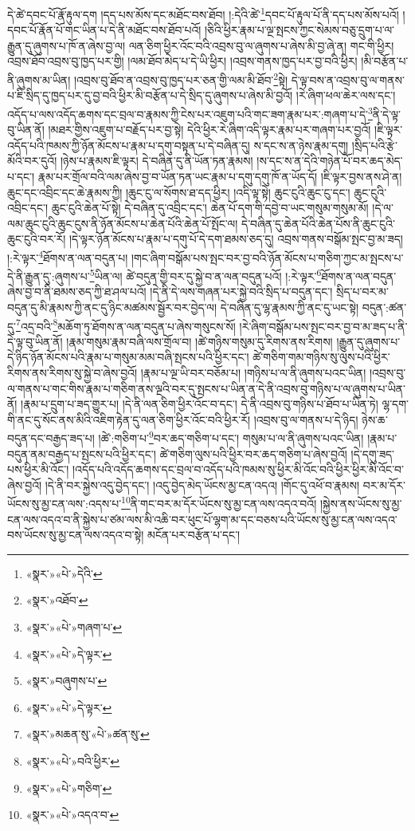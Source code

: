 དེ་ཚེ་དབང་པོ་རྣོ་རྟུལ་དག །དད་པས་མོས་དང་མཐོང་བས་ཐོབ། །:དེའི་ཚེ་\footnote{«སྣར་»«པེ་»དེའི་}དབང་པོ་རྟུལ་པོ་ནི་དད་པས་མོས་པའོ། །དབང་པོ་རྣོན་པོ་གང་ཡིན་པ་དེ་ནི་མཐོང་བས་ཐོབ་པའོ། །ཅིའི་ཕྱིར་རྣམ་པ་ལྔ་སྤངས་ཀྱང་སེམས་བཅུ་དྲུག་པ་ལ་རྒྱུན་དུ་ཞུགས་པ་ཁོ་ན་ཞེས་བྱ་ལ། ལན་ཅིག་ཕྱིར་འོང་བའི་འབྲས་བུ་ལ་ཞུགས་པ་ཞེས་མི་བྱ་ཞེ་ན། གང་གི་ཕྱིར། འབྲས་ཐོབ་འབྲས་བུ་ཁྱད་པར་གྱི། །ལམ་ཐོབ་མེད་པ་དེ་ཡི་ཕྱིར། །འབྲས་གནས་ཁྱད་པར་བྱ་བའི་ཕྱིར། །མི་བརྩོན་པ་ནི་ཞུགས་མ་ཡིན། །འབྲས་བུ་ཐོབ་ན་འབྲས་བུ་ཁྱད་པར་ཅན་གྱི་ལམ་མི་ཐོབ་\footnote{«སྣར་»འཐོབ་}སྟེ། དེ་ལྟ་བས་ན་འབྲས་བུ་ལ་གནས་པ་ཇི་སྲིད་དུ་ཁྱད་པར་དུ་བྱ་བའི་ཕྱིར་མི་བརྩོན་པ་དེ་སྲིད་དུ་ཞུགས་པ་ཞེས་མི་བྱའོ། །རེ་ཞིག་ཕལ་ཆེར་ལས་དང་། འདོད་པ་ལས་འདོད་ཆགས་དང་བྲལ་བ་རྣམས་ཀྱི་ངེས་པར་འཇུག་པའི་གང་ཟག་རྣམ་པར་:གཞག་པ་དེ་\footnote{«སྣར་»«པེ་»གཞག་པ་}ནི་དེ་ལྟ་བུ་ཡིན་ནོ། །མཐར་གྱིས་འཇུག་པ་བརྗོད་པར་བྱ་སྟེ། དེའི་ཕྱིར་རེ་ཞིག་འདི་ལྟར་རྣམ་པར་གཞག་པར་བྱའོ། །ཇི་ལྟར་འདོད་པའི་ཁམས་ཀྱི་ཉོན་མོངས་པ་རྣམ་པ་དགུ་བསྟན་པ་དེ་བཞིན་དུ། ས་དང་ས་ན་ཉེས་རྣམ་དགུ། །སྲིད་པའི་རྩེ་མོའི་བར་དུའོ། །ཉེས་པ་རྣམས་ཇི་ལྟར། དེ་བཞིན་དུ་ནི་ཡོན་ཏན་རྣམས། །ས་དང་ས་ན་དེའི་གཉེན་པོ་བར་ཆད་མེད་པ་དང་། རྣམ་པར་གྲོལ་བའི་ལམ་ཞེས་བྱ་བ་ཡོན་ཏན་ཡང་རྣམ་པ་དགུ་དགུ་ཁོ་ན་ཡོད་དོ། །ཇི་ལྟར་བྱས་ནས་ཤེ་ན། ཆུང་དང་འབྲིང་དང་ཆེ་རྣམས་ཀྱི། །ཆུང་ངུ་ལ་སོགས་ཐ་དད་ཕྱིར། །འདི་ལྟ་སྟེ། ཆུང་ངུའི་ཆུང་ངུ་དང་། ཆུང་ངུའི་འབྲིང་དང་། ཆུང་ངུའི་ཆེན་པོ་སྟེ། དེ་བཞིན་དུ་འབྲིང་དང་། ཆེན་པོ་དག་གི་དབྱེ་བ་ཡང་གསུམ་གསུམ་མོ། །དེ་ལ་ལམ་ཆུང་ངུའི་ཆུང་ངུས་ནི་ཉོན་མོངས་པ་ཆེན་པོའི་ཆེན་པོ་སྤོང་ལ། དེ་བཞིན་དུ་ཆེན་པོའི་ཆེན་པོས་ནི་ཆུང་ངུའི་ཆུང་ངུའི་བར་རོ། །དེ་ལྟར་ཉོན་མོངས་པ་རྣམ་པ་དགུ་པོ་དེ་དག་ཐམས་ཅད་དུ། འབྲས་གནས་བསྒོམ་སྤང་བྱ་མ་ཟད། །:རེ་ལྟར་\footnote{«སྣར་»«པེ་»དེ་ལྟར་}ཐོགས་ན་ལན་བདུན་པ། །གང་ཞིག་བསྒོམ་པས་སྤང་བར་བྱ་བའི་ཉོན་མོངས་པ་གཅིག་ཀྱང་མ་སྤངས་པ་དེ་ནི་རྒྱུན་དུ་:ཞུགས་པ་\footnote{«སྣར་»བཞུགས་པ་}ཡིན་ལ། ཚེ་བདུན་གྱི་བར་དུ་སྐྱེ་བ་ན་ལན་བདུན་པའོ། །:རེ་ལྟར་\footnote{«སྣར་»«པེ་»དེ་ལྟར་}ཐོགས་ན་ལན་བདུན་ཞེས་བྱ་བ་ནི་ཐམས་ཅད་ཀྱི་ཐ་ཤལ་པའོ། །དེ་ནི་དེ་ལས་གཞན་པར་སྐྱེ་བའི་སྲིད་པ་བདུན་དང་། སྲིད་པ་བར་མ་བདུན་དུ་མི་རྣམས་ཀྱི་ནང་དུ་ཉིང་མཚམས་སྦྱོར་བར་བྱེད་ལ། དེ་བཞིན་དུ་ལྷ་རྣམས་ཀྱི་ནང་དུ་ཡང་སྟེ། བདུན་:ཚན་དུ་\footnote{«སྣར་»མཆན་སུ་«པེ་»ཚན་སུ་}འདྲ་བའི་\footnote{«སྣར་»«པེ་»བའི་ཕྱིར་}མཆོག་ཏུ་ཐོགས་ན་ལན་བདུན་པ་ཞེས་གསུངས་སོ། །རེ་ཞིག་བསྒོམ་པས་སྤང་བར་བྱ་བ་མ་ཟད་པ་ནི་དེ་ལྟ་བུ་ཡིན་ནོ། །རྣམ་གསུམ་རྣམ་བཞི་ལས་གྲོལ་བ། །ཚེ་གཉིས་གསུམ་དུ་རིགས་ནས་རིགས། །རྒྱུན་དུ་ཞུགས་པ་དེ་ཉིད་ཉོན་མོངས་པའི་རྣམ་པ་གསུམ་མམ་བཞི་སྤངས་པའི་ཕྱིར་དང་། ཚེ་གཅིག་གམ་གཉིས་སུ་ལུས་པའི་ཕྱིར་རིགས་ནས་རིགས་སུ་སྐྱེ་བ་ཞེས་བྱའོ། །རྣམ་པ་ལྔ་ཡི་བར་བཅོམ་པ། །གཉིས་པ་ལ་ནི་ཞུགས་པའང་ཡིན། །འབྲས་བུ་ལ་གནས་པ་གང་གིས་རྣམ་པ་གཅིག་ནས་ལྔའི་བར་དུ་སྤངས་པ་ཡིན་ན་དེ་ནི་འབྲས་བུ་གཉིས་པ་ལ་ཞུགས་པ་ཡིན་ནོ། །རྣམ་པ་དྲུག་པ་ཟད་གྱུར་པ། །དེ་ནི་ལན་ཅིག་ཕྱིར་འོང་བ་དང་། དེ་ནི་འབྲས་བུ་གཉིས་པ་ཐོབ་པ་ཡིན་ཏེ། ལྷ་དག་གི་ནང་དུ་སོང་ནས་མིའི་འཇིག་རྟེན་དུ་ལན་ཅིག་ཕྱིར་འོང་བའི་ཕྱིར་རོ། །འབྲས་བུ་ལ་གནས་པ་དེ་ཉིད། ཉེས་ཆ་བདུན་དང་བརྒྱད་ཟད་པ། །ཚེ་:གཅིག་པ་\footnote{«སྣར་»«པེ་»གཅིག་}བར་ཆད་གཅིག་པ་དང་། གསུམ་པ་ལ་ནི་ཞུགས་པའང་ཡིན། །རྣམ་པ་བདུན་ནམ་བརྒྱད་པ་སྤངས་པའི་ཕྱིར་དང་། ཚེ་གཅིག་ལུས་པའི་ཕྱིར་བར་ཆད་གཅིག་པ་ཞེས་བྱའོ། །དེ་དགུ་ཟད་པས་ཕྱིར་མི་འོང་། །འདོད་པའི་འདོད་ཆགས་དང་བྲལ་བ་འདོད་པའི་ཁམས་སུ་ཕྱིར་མི་འོང་བའི་ཕྱིར་ཕྱིར་མི་འོང་བ་ཞེས་བྱའོ། །དེ་ནི་བར་སྐྱེས་འདུ་བྱེད་དང་། །འདུ་བྱེད་མེད་ཡོངས་མྱ་ངན་འདའ། །གོང་དུ་འཕོ་བ་རྣམས། བར་མ་དོར་ཡོངས་སུ་མྱ་ངན་ལས་:འདས་པ་\footnote{«སྣར་»«པེ་»འདའ་བ་}ནི་གང་བར་མ་དོར་ཡོངས་སུ་མྱ་ངན་ལས་འདའ་བའོ། །སྐྱེས་ནས་ཡོངས་སུ་མྱ་ངན་ལས་འདའ་བ་ནི་སྐྱེས་པ་ཙམ་ལས་མི་འཆི་བར་ཕུང་པོ་ལྷག་མ་དང་བཅས་པའི་ཡོངས་སུ་མྱ་ངན་ལས་འདའ་བས་ཡོངས་སུ་མྱ་ངན་ལས་འདའ་བ་སྟེ། མངོན་པར་བརྩོན་པ་དང་། 
